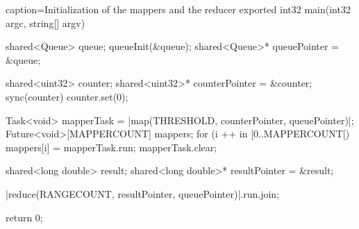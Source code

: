 \begin{ccode}{caption=Initialization of the mappers and the reducer}
exported int32 main(int32 argc, string[] argv) { 
  shared<Queue> queue; 
  queueInit(&queue); 
  shared<Queue>* queuePointer = &queue; 
   
  shared<uint32> counter; 
  shared<uint32>* counterPointer = &counter; 
  sync(counter) { counter.set(0); } 

  Task<void> mapperTask = |map(THRESHOLD, counterPointer, queuePointer)|; 
  Future<void>[MAPPERCOUNT] mappers; 
  for (i ++ in [0..MAPPERCOUNT[) { 
    mappers[i] = mapperTask.run; 
  }
  mapperTask.clear;
   
  shared<long double> result; 
  shared<long double>* resultPointer = &result; 
   
  |reduce(RANGECOUNT, resultPointer, queuePointer)|.run.join;
  
  return 0; 
}
\end{ccode}

